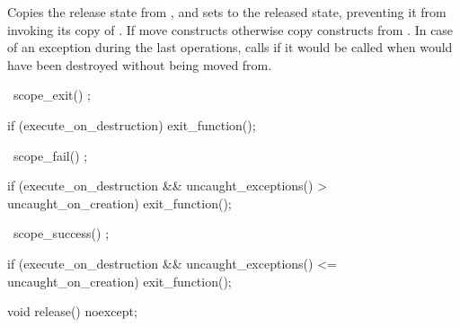 \documentclass[ebook,11pt,article]{memoir}
\begin{document}
\begin{itemdescr}
\pnum
\effects Copies the release state from , and sets  to the released state, preventing it from invoking its copy of . If  move constructs otherwise copy constructs  from .  In case of an exception during the last operations, calls  if it would be called when  would have been destroyed without being moved from.
\end{itemdescr}

\begin{itemdecl}
~scope_exit() ;
\end{itemdecl}

\begin{itemdescr}
\pnum
\effects 
\begin{codeblock}
if (execute_on_destruction)
	exit_function();
\end{codeblock}
\end{itemdescr}

\begin{itemdecl}
~scope_fail() ;
\end{itemdecl}

\begin{itemdescr}
\pnum
\effects 
\begin{codeblock}
if (execute_on_destruction
   && uncaught_exceptions() > uncaught_on_creation)
	exit_function();
\end{codeblock}
\end{itemdescr}

\begin{itemdecl}
~scope_success() ;
\end{itemdecl}

\begin{itemdescr}
\pnum
\effects
\begin{codeblock}
if (execute_on_destruction 
   && uncaught_exceptions() <= uncaught_on_creation)
	exit_function();   
\end{codeblock}
\end{itemdescr}

\begin{itemdecl}
void release() noexcept;
\end{itemdecl}
\end{document}
